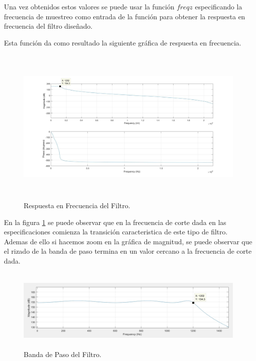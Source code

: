 \documentclass[12pt]{article}
\begin{document}


Una vez obtenidos estos valores se puede usar la función $freqz$ especificando la frecuencia de muestreo como entrada de la función para obtener la respuesta en frecuencia del filtro diseñado.



Esta función da como resultado la siguiente gráfica de respuesta en frecuencia.


\begin{figure}[h]
    \centering
    \includegraphics[width=15cm, height=7.7cm]{imagenes/result.jpg}
    \caption{Respuesta en Frecuencia del Filtro.}
    \label{fig:freqz}
\end{figure}

En la figura \ref{fig:freqz} se puede observar que en la frecuencia de corte dada en las especificaciones comienza la transición caracteristica de este tipo de filtro.
\\
Ademas de ello si hacemos zoom en la gráfica de magnitud, se puede observar que el rizado de la banda de paso termina en un valor cercano a la frecuencia de corte dada.

\begin{figure}[h]
    \centering
    \includegraphics[width=15cm, height=4cm]{imagenes/rizado.jpg}
    \caption{Banda de Paso del Filtro.}
    \label{fig:feqz}
\end{figure}
\end{document}
